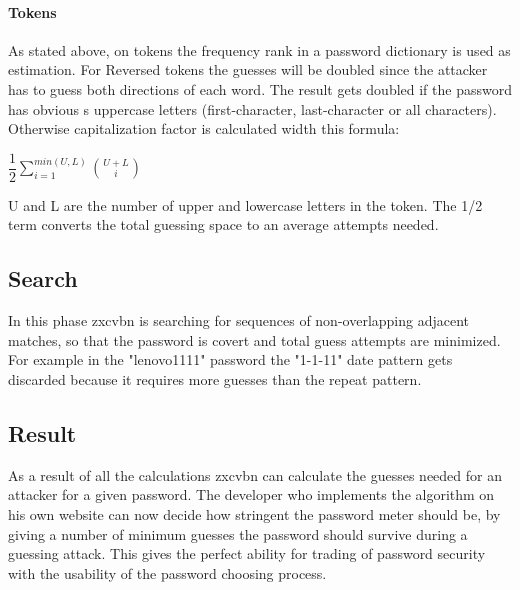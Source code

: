 \documentclass[12pt,a4paper]{article}
\begin{document}
\paragraph{Tokens}
As stated above, on tokens the frequency rank in a password dictionary is used as estimation. For Reversed tokens the guesses will be doubled since the attacker has to guess both directions of each word. The result gets doubled if the password has obvious s uppercase letters (first-character, last-character or all characters). Otherwise capitalization factor is calculated width this formula:

\begin{center} $ \dfrac{1}{2} \sum\limits_{i=1}^{min(U,L)} \binom{U+L}{i} $ \end{center}

U and L are the number of upper and lowercase letters in the token. The 1/2 term converts the total guessing space to an average attempts needed.


\subsection{Search}

In this phase zxcvbn is searching for sequences of non-overlapping adjacent matches, so that the password is covert and total guess attempts are minimized. For example in the "lenovo1111" password the "1-1-11" date pattern gets discarded because it requires more guesses than the repeat pattern.

\subsection{Result}
As a result of all the calculations zxcvbn can calculate the guesses needed for an attacker for a given password. The developer who implements the algorithm on his own website can now decide how stringent the password meter should be, by giving a number of minimum guesses the password should survive during a guessing attack. This gives the perfect ability for trading of password security with the usability of the password choosing process.
\end{document}
